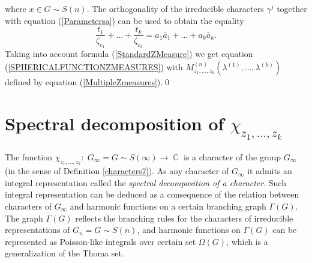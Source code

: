 \documentclass[12pt]{amsart}
\theoremstyle{definition}
\numberwithin{equation}{section}
\DeclareMathOperator{\C}{\mathbb{C}}
\begin{document}
where $x\in G\sim S(n)$.
The orthogonality of the irreducible characters $\gamma^{j}$  together with equation (\ref{Parametersa})
can be used to obtain the equality
$$
\frac{t_1}{\zeta_{c_1}}+\ldots+\frac{t_k}{\zeta_{c_k}}=a_1\bar{a}_1+\ldots+a_k\bar{a}_k.
$$
Taking into account formula (\ref{StandardZMeasure}) we get equation (\ref{SPHERICALFUNCTIONZMEASURES}) with
$M_{z_1,\ldots,z_k}^{(n)}\left(\lambda^{(1)},\ldots,\lambda^{(k)}\right)$ defined by equation
(\ref{MultipleZmeasures}).\qed\\
\section{Spectral decomposition of $\chi_{z_1,\ldots,z_k}$}
The function $\chi_{z_1,\ldots,z_k}:\; G_{\infty}=G\sim S(\infty)\longrightarrow\C$ is
a character of the group $G_{\infty}$ (in the sense of Definition
\ref{characters7}). As any character of $G_{\infty}$ it admits an integral representation called the \textit{spectral decomposition of a character}.
Such integral representation can be deduced as a consequence of the relation between
characters of $G_{\infty}$ and harmonic functions  on a certain branching graph $\Gamma\left(G\right)$. The graph $\Gamma\left(G\right)$ reflects the branching rules for the characters of irreducible representations of $G_n=G\sim S(n)$, and harmonic functions on $\Gamma\left(G\right)$ can be represented as  Poisson-like integrals over certain set $\Omega\left(G\right)$,  which is  a generalization of the Thoma set.
\end{document}
